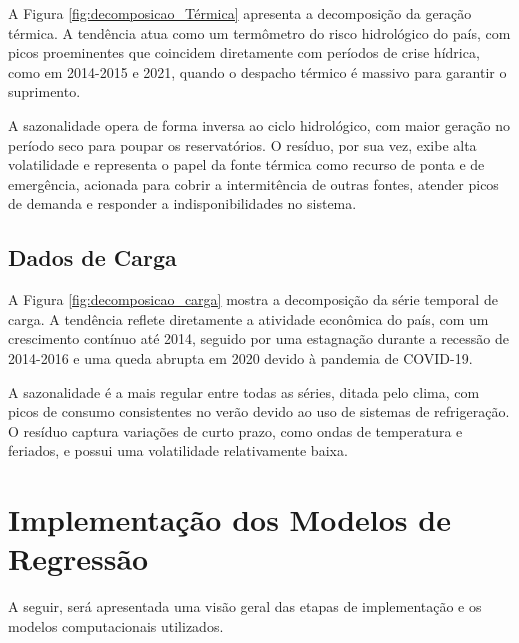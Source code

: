 A Figura \ref{fig:decomposicao_Térmica} apresenta a decomposição da geração térmica. A tendência atua 
como um termômetro do risco hidrológico do país, com picos proeminentes que coincidem diretamente com períodos de crise hídrica, 
como em 2014-2015 e 2021, quando o despacho térmico é massivo para garantir o suprimento. 

A sazonalidade opera de forma inversa ao ciclo hidrológico, com maior geração no período seco para poupar os reservatórios. 
O resíduo, por sua vez, exibe alta volatilidade e representa o papel da fonte térmica como recurso de ponta e de emergência, 
acionada para cobrir a intermitência de outras fontes, atender picos de demanda e responder a indisponibilidades no sistema. 


\subsection{Dados de Carga} %
\begin{figure}[!ht]
  {}
  {}
\end{figure}
A Figura \ref{fig:decomposicao_carga} mostra a decomposição da série temporal de carga. A tendência
reflete diretamente a atividade econômica do país, com um crescimento contínuo até 2014, seguido por uma estagnação durante 
a recessão de 2014-2016 e uma queda abrupta em 2020 devido à pandemia de COVID-19. \cite{Magazzino2021}

A sazonalidade é a mais regular entre todas as séries, ditada pelo clima, com picos de consumo consistentes no verão devido 
ao uso de sistemas de refrigeração. O resíduo captura variações de curto prazo, como ondas de temperatura e feriados, e 
possui uma volatilidade relativamente baixa.


\section{Implementação dos Modelos de Regressão} %
A seguir, será apresentada uma visão geral das etapas de implementação e os modelos computacionais utilizados.

